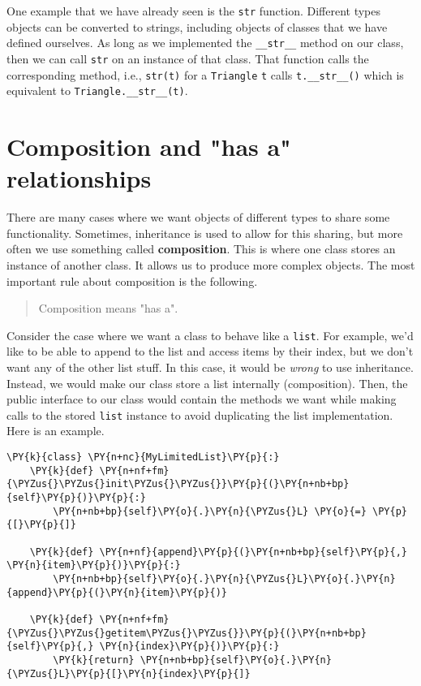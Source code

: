 One example that we have already seen is the \texttt{str} function.  Different types objects can be converted to strings, including objects of classes that we have defined ourselves.  As long as we implemented the \texttt{\_\_str\_\_} method on our class, then we can call \texttt{str} on an instance of that class.  That function calls the corresponding method, i.e., \texttt{str(t)} for a \texttt{Triangle} \texttt{t} calls \texttt{t.\_\_str\_\_()} which is equivalent to \texttt{Triangle.\_\_str\_\_(t)}.   

\section{Composition and "has a" relationships}


There are many cases where we want objects of different types to share some functionality.  Sometimes, inheritance is used to allow for this sharing, but more often we use something called \textbf{composition}.  This is where one class stores an instance of another class.  It allows us to produce more complex objects.  The most important rule about composition is the following.

\begin{quote}

Composition means "has a".

\end{quote}

Consider the case where we want a class to behave like a \texttt{list}.  For example, we’d like to be able to append to the list and access items by their index, but we don’t want any of the other list stuff.  In this case, it would be \emph{wrong} to use inheritance.  Instead, we would make our class store a list internally (composition).  Then, the public interface to our class would contain the methods we want while making calls to the stored \texttt{list} instance to avoid duplicating the list implementation.  Here is an example.

\begin{Verbatim}[commandchars=\\\{\}]
\PY{k}{class} \PY{n+nc}{MyLimitedList}\PY{p}{:}
    \PY{k}{def} \PY{n+nf+fm}{\PYZus{}\PYZus{}init\PYZus{}\PYZus{}}\PY{p}{(}\PY{n+nb+bp}{self}\PY{p}{)}\PY{p}{:}
        \PY{n+nb+bp}{self}\PY{o}{.}\PY{n}{\PYZus{}L} \PY{o}{=} \PY{p}{[}\PY{p}{]}

    \PY{k}{def} \PY{n+nf}{append}\PY{p}{(}\PY{n+nb+bp}{self}\PY{p}{,} \PY{n}{item}\PY{p}{)}\PY{p}{:}
        \PY{n+nb+bp}{self}\PY{o}{.}\PY{n}{\PYZus{}L}\PY{o}{.}\PY{n}{append}\PY{p}{(}\PY{n}{item}\PY{p}{)}

    \PY{k}{def} \PY{n+nf+fm}{\PYZus{}\PYZus{}getitem\PYZus{}\PYZus{}}\PY{p}{(}\PY{n+nb+bp}{self}\PY{p}{,} \PY{n}{index}\PY{p}{)}\PY{p}{:}
        \PY{k}{return} \PY{n+nb+bp}{self}\PY{o}{.}\PY{n}{\PYZus{}L}\PY{p}{[}\PY{n}{index}\PY{p}{]}
\end{Verbatim}



